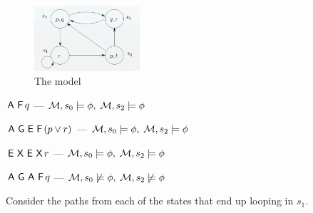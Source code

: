 \question 

\begin{figure}[ht]
    \centering
    \includegraphics[width=0.35\textwidth]{fig/q4ts.png}
    \caption{The model}
    \label{fig:q4ts}
\end{figure}

\begin{alphaparts}
    \questionpart $\,\textsf{A}\,\,\textsf{F}\, q$ --- $\mathcal{M}, s_0 \models \phi,\; \mathcal{M}, s_2 \models \phi$ 
    
    \questionpart $\,\textsf{A}\,\,\textsf{G}\, \,\textsf{E}\,\,\textsf{F}\, (p \lor r)$ --- $\mathcal{M}, s_0 \models \phi,\; \mathcal{M}, s_2 \models \phi$ 
    
    \questionpart $\,\textsf{E}\,\,\textsf{X}\,\,\textsf{E}\,\,\textsf{X}\, r$ --- $\mathcal{M}, s_0 \models \phi,\; \mathcal{M}, s_2 \models \phi$ 
    
    \questionpart $\,\textsf{A}\,\,\textsf{G}\,\,\textsf{A}\,\,\textsf{F}\, q$ --- $\mathcal{M}, s_0 \not\models \phi,\; \mathcal{M}, s_2 \not\models \phi$ 
    
    Consider the paths from each of the states that end up looping in $s_1$.
\end{alphaparts}